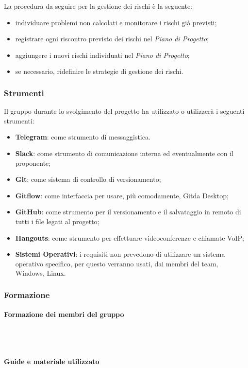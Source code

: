    				La procedura da seguire per la gestione dei rischi è la seguente:
   				\begin{itemize}
   					\item individuare problemi non calcolati e monitorare i rischi già previsti;
   					\item registrare ogni riscontro previsto dei rischi nel \textit{Piano di Progetto};
   					\item aggiungere i nuovi rischi individuati nel \textit{Piano di Progetto};
   					\item  se necessario, ridefinire le strategie di gestione dei rischi.
   				\end{itemize}
   		\subsubsection{Strumenti}
   			Il gruppo durante lo svolgimento del progetto ha utilizzato o utilizzerà i seguenti strumenti:
   			\begin{itemize}
   				\item \textbf{Telegram\glos}: come strumento di messaggistica.
   				\item \textbf{Slack\glos}: come strumento di comunicazione interna ed eventualmente con il proponente;
   				\item \textbf{Git\glos}: come sistema di controllo di versionamento;
   				\item \textbf{Gitflow\glos}: come interfaccia per usare, più comodamente, Git\glo da Desktop;
   				\item \textbf{GitHub\glos}: come strumento per il versionamento e il salvataggio in remoto di tutti i file legati al progetto;
   				\item \textbf{Hangouts\glos}: come strumento per effettuare videoconferenze e chiamate VoIP;
   				\item \textbf{Sistemi Operativi}: i requisiti non prevedono di utilizzare un sistema operativo specifico, per questo verranno usati, dai membri del team, Windows, Linux.
   			\end{itemize}
   		\subsubsection{Formazione}
   			\paragraph{Formazione dei membri del gruppo} \mbox{}\\ \mbox{}\\
   				
   			\paragraph{Guide e materiale utilizzato}\mbox{}\\ \mbox{}\\
